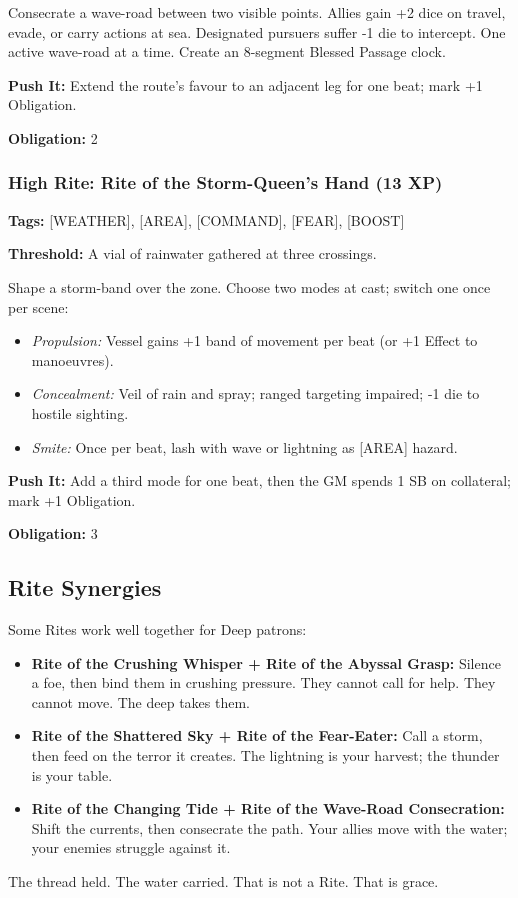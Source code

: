 Consecrate a wave-road between two visible points. Allies gain +2 dice on travel, evade, or carry actions at sea. Designated pursuers suffer -1 die to intercept. One active wave-road at a time. Create an 8-segment Blessed Passage clock.

\textbf{Push It:} Extend the route's favour to an adjacent leg for one beat; mark +1 Obligation.

\textbf{Obligation:} 2

\subsubsection{High Rite: Rite of the Storm-Queen's Hand (13 XP)}

\textbf{Tags:} [WEATHER], [AREA], [COMMAND], [FEAR], [BOOST]

\textbf{Threshold:} A vial of rainwater gathered at three crossings.

Shape a storm-band over the zone. Choose two modes at cast; switch one once per scene:
\begin{itemize}
\item \textit{Propulsion:} Vessel gains +1 band of movement per beat (or +1 Effect to manoeuvres).
\item \textit{Concealment:} Veil of rain and spray; ranged targeting impaired; -1 die to hostile sighting.
\item \textit{Smite:} Once per beat, lash with wave or lightning as [AREA] hazard.
\end{itemize}

\textbf{Push It:} Add a third mode for one beat, then the GM spends 1 SB on collateral; mark +1 Obligation.

\textbf{Obligation:} 3

\subsection{Rite Synergies}

Some Rites work well together for Deep patrons:

\begin{itemize}
\item \textbf{Rite of the Crushing Whisper + Rite of the Abyssal Grasp:} Silence a foe, then bind them in crushing pressure. They cannot call for help. They cannot move. The deep takes them.
\item \textbf{Rite of the Shattered Sky + Rite of the Fear-Eater:} Call a storm, then feed on the terror it creates. The lightning is your harvest; the thunder is your table.
\item \textbf{Rite of the Changing Tide + Rite of the Wave-Road Consecration:} Shift the currents, then consecrate the path. Your allies move with the water; your enemies struggle against it.
\end{itemize}

The thread held. The water carried. That is not a Rite. That is grace.
